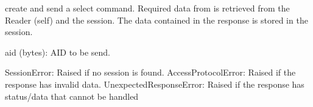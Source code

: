 \documentclass[letterpaper,10pt,english]{sphinxmanual}
\begin{document}
\begin{fulllineitems}
\begin{fulllineitems}
\label{\detokenize{aliro_actuator.access_protocol.reader:aliro_actuator.access_protocol.reader.Reader.handle_select}}
\pysigstartsignatures
{}
\pysigstopsignatures
\sphinxAtStartPar
create and send a select command.
Required data from is retrieved from the Reader (self) and the session.
The data contained in the response is stored in the session.
\begin{description}
\sphinxAtStartPar
aid (bytes): AID to be send.

\sphinxAtStartPar
SessionError: Raised if no session is found.
AccessProtocolError: Raised if the response has invalid data.
UnexpectedResponseError: Raised if the response has status/data that
cannot be handled

\end{description}

\end{fulllineitems}


\begin{fulllineitems}
\label{\detokenize{aliro_actuator.access_protocol.reader:aliro_actuator.access_protocol.reader.Reader.reader_group_identifier}}
\pysigstartsignatures
{}
\pysigstopsignatures
\end{fulllineitems}


\begin{fulllineitems}
\label{\detokenize{aliro_actuator.access_protocol.reader:aliro_actuator.access_protocol.reader.Reader.reader_group_sub_identifier}}
\pysigstartsignatures
{}
\pysigstopsignatures
\end{fulllineitems}


\end{fulllineitems}
\end{document}
